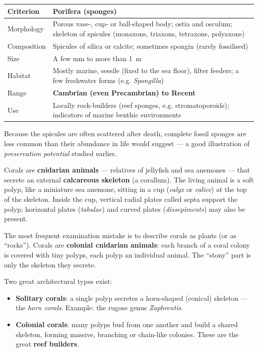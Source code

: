 \documentclass[11pt]{article}
\newcommand{\cle}[1]{{\popxbold\color{popdark}#1}}
\newcounter{popsec}
\newcounter{popsub}
\newcommand{\courssub}[1]{%
  \stepcounter{popsub}%
  \par\vspace{9pt}\noindent{\popxbold\fontsize{11.5}{13}\selectfont\color{popink}{\color{poporange}\thepopsec.\thepopsub}\hspace{6pt}#1}\par\nopagebreak\vspace{4pt}
}
\begin{document}
\begin{tabularx}{\linewidth}{|l|X|}
\hline
\rowcolor{popblueL} \textbf{Criterion} & \textbf{Porifera (sponges)} \\
\hline
Morphology & Porous vase-, cup- or ball-shaped body; ostia and osculum; skeleton of spicules (monaxons, triaxons, tetraxons, polyaxons) \\
\hline
Composition & Spicules of silica or calcite; sometimes spongin (rarely fossilised) \\
\hline
Size & A few mm to more than \SI{1}{m} \\
\hline
Habitat & Mostly marine, sessile (fixed to the sea floor), filter feeders; a few freshwater forms (e.g. \emph{Spongilla}) \\
\hline
Range & \textbf{Cambrian (even Precambrian) to Recent} \\
\hline
Use & Locally rock-builders (reef sponges, e.g. stromatoporoids); indicators of marine benthic environments \\
\hline
\end{tabularx}

Because the spicules are often scattered after death, complete fossil sponges are less common than their abundance in life would suggest --- a good illustration of \emph{preservation potential} studied earlier.

\courssub{Phylum Cnidaria: The Corals}

Corals are \textbf{cnidarian animals} --- relatives of jellyfish and sea anemones --- that secrete an external \textbf{calcareous skeleton} (a corallum). The living animal is a soft polyp, like a miniature sea anemone, sitting in a cup (\emph{calyx} or \emph{calice}) at the top of the skeleton. Inside the cup, vertical radial plates called \cle{septa} support the polyp; horizontal plates (\emph{tabulae}) and curved plates (\emph{dissepiments}) may also be present.

\begin{attention}
The most frequent examination mistake is to describe corals as plants (or as ``rocks''). Corals are \textbf{colonial cnidarian animals}: each branch of a coral colony is covered with tiny polyps, each polyp an individual animal. The ``stony'' part is only the skeleton they secrete.
\end{attention}

Two great architectural types exist:

\begin{itemize}
\item \textbf{Solitary corals}: a single polyp secretes a horn-shaped (conical) skeleton --- the \emph{horn corals}. Example: the rugose genus \emph{Zaphrentis}.
\item \textbf{Colonial corals}: many polyps bud from one another and build a shared skeleton, forming massive, branching or chain-like colonies. These are the great \textbf{reef builders}.
\end{itemize}
\end{document}
